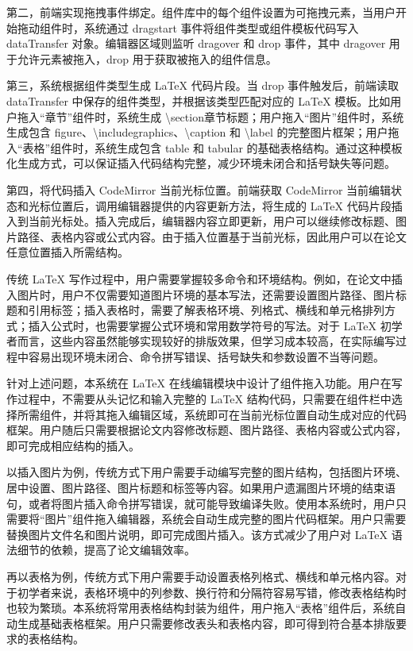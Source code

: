 \documentclass{xduugthesis}
\begin{document}
第二，前端实现拖拽事件绑定。组件库中的每个组件设置为可拖拽元素，当用户开始拖动组件时，系统通过 dragstart 事件将组件类型或组件模板代码写入 dataTransfer 对象。编辑器区域则监听 dragover 和 drop 事件，其中 dragover 用于允许元素被拖入，drop 用于获取被拖入的组件信息。

第三，系统根据组件类型生成 LaTeX 代码片段。当 drop 事件触发后，前端读取 dataTransfer 中保存的组件类型，并根据该类型匹配对应的 LaTeX 模板。比如用户拖入“章节”组件时，系统生成 \textbackslash section{章节标题}；用户拖入“图片”组件时，系统生成包含 figure、\textbackslash includegraphics、\textbackslash caption 和 \textbackslash label 的完整图片框架；用户拖入“表格”组件时，系统生成包含 table 和 tabular 的基础表格结构。通过这种模板化生成方式，可以保证插入代码结构完整，减少环境未闭合和括号缺失等问题。

第四，将代码插入 CodeMirror 当前光标位置。前端获取 CodeMirror 当前编辑状态和光标位置后，调用编辑器提供的内容更新方法，将生成的 LaTeX 代码片段插入到当前光标处。插入完成后，编辑器内容立即更新，用户可以继续修改标题、图片路径、表格内容或公式内容。由于插入位置基于当前光标，因此用户可以在论文任意位置插入所需结构。

传统 LaTeX 写作过程中，用户需要掌握较多命令和环境结构。例如，在论文中插入图片时，用户不仅需要知道图片环境的基本写法，还需要设置图片路径、图片标题和引用标签；插入表格时，需要了解表格环境、列格式、横线和单元格排列方式；插入公式时，也需要掌握公式环境和常用数学符号的写法。对于 LaTeX 初学者而言，这些内容虽然能够实现较好的排版效果，但学习成本较高，在实际编写过程中容易出现环境未闭合、命令拼写错误、括号缺失和参数设置不当等问题。

针对上述问题，本系统在 LaTeX 在线编辑模块中设计了组件拖入功能。用户在写作过程中，不需要从头记忆和输入完整的 LaTeX 结构代码，只需要在组件栏中选择所需组件，并将其拖入编辑区域，系统即可在当前光标位置自动生成对应的代码框架。用户随后只需要根据论文内容修改标题、图片路径、表格内容或公式内容，即可完成相应结构的插入。

以插入图片为例，传统方式下用户需要手动编写完整的图片结构，包括图片环境、居中设置、图片路径、图片标题和标签等内容。如果用户遗漏图片环境的结束语句，或者将图片插入命令拼写错误，就可能导致编译失败。使用本系统时，用户只需要将“图片”组件拖入编辑器，系统会自动生成完整的图片代码框架。用户只需要替换图片文件名和图片说明，即可完成图片插入。该方式减少了用户对 LaTeX 语法细节的依赖，提高了论文编辑效率。

再以表格为例，传统方式下用户需要手动设置表格列格式、横线和单元格内容。对于初学者来说，表格环境中的列参数、换行符和分隔符容易写错，修改表格结构时也较为繁琐。本系统将常用表格结构封装为组件，用户拖入“表格”组件后，系统自动生成基础表格框架。用户只需要修改表头和表格内容，即可得到符合基本排版要求的表格结构。
\end{document}
